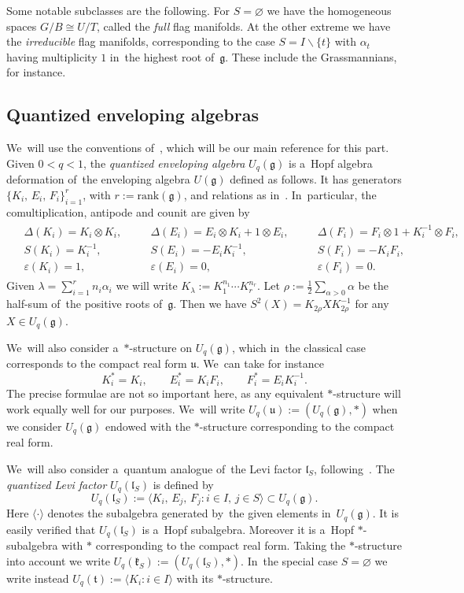 \documentclass[pdftex]{sigma}
\numberwithin{equation}{section}
\newcommand{\lieg}{\mathfrak{g}}
\newcommand{\liel}{\mathfrak{l}}
\newcommand{\lieu}{\mathfrak{u}}
\newcommand{\Uqg}{U_q(\mathfrak{g})}
\newcommand{\Uqt}{U_q(\mathfrak{t})}
\newcommand{\Uqu}{U_q(\mathfrak{u})}
\newcommand{\UqkS}{U_q(\mathfrak{k}_S)}
\newcommand{\UqlS}{U_q(\mathfrak{l}_S)}
\begin{document}
Some notable subclasses are the following.
For $S = \varnothing$ we have the homogeneous spaces $G / B \cong U / T$, called the \emph{full} flag manifolds.
At the other extreme we have the \emph{irreducible} flag manifolds, corresponding to the case $S = I \backslash \{t\}$ with $\alpha_t$ having multiplicity $1$ in~the highest root of~$\lieg$. These include the Grassmannians, for instance.

\subsection{Quantized enveloping algebras}

We~will use the conventions of~\cite{klsc}, which will be our main reference for this part.
Given $0 < q < 1$, the \emph{quantized enveloping algebra} $\Uqg$ is a~Hopf algebra deformation of~the enveloping algebra $U(\lieg)$ defined as follows.
It has generators $\{ K_i,\,E_i,\, F_i \}_{i = 1}^r$, with $r := \mathrm{rank}(\lieg)$, and relations as in~\cite[Section~6.1.2]{klsc}.
In~particular, the comultiplication, antipode and counit are given by
\begin{gather*}
\begin{aligned}
&\Delta(K_i) = K_i \otimes K_i,\quad
&&\Delta(E_i) = E_i \otimes K_i + 1 \otimes E_i,\quad
&&\Delta(F_i) = F_i \otimes 1 + K_i^{-1} \otimes F_i,
\\
&S(K_i) = K_i^{-1},
&&S(E_i) = - E_i K_i^{-1},
&&S(F_i) = - K_i F_i,
\\
&\varepsilon(K_i) = 1,
&&\varepsilon(E_i) = 0,
&&\varepsilon(F_i) = 0.
\end{aligned}
\end{gather*}
Given $\lambda = \sum_{i = 1}^r n_i \alpha_i$ we will write $K_\lambda := K_1^{n_1} \cdots K_r^{n_r}$.
Let $\rho := \frac{1}{2} \sum_{\alpha > 0} \alpha$ be the half-sum of~the positive roots of~$\lieg$.
Then we have $S^2(X) = K_{2 \rho} X K_{2 \rho}^{-1}$ for any $X \in \Uqg$.

We~will also consider a~$*$-structure on $\Uqg$, which in~the classical case corresponds to the compact real form $\lieu$.
We~can take for instance
\[
K_i^* = K_i, \qquad
E_i^* = K_i F_i, \qquad
F_i^* = E_i K_i^{-1}.
\]
The precise formulae are not so important here, as any equivalent $*$-structure will work equally well for our purposes.
We~will write $\Uqu := (\Uqg, *)$ when we consider $\Uqg$ endowed with the $*$-structure corresponding to the compact real form.

We~will also consider a~quantum analogue of~the Levi factor $\liel_S$, following~\cite{quantum-flag}.
The \emph{quantized Levi factor} $\UqlS$ is defined by
\[
\UqlS := \langle K_i, \, E_j, \, F_j \colon i \in I, \, j \in S \rangle \subset \Uqg.
\]
Here $\langle \cdot \rangle$ denotes the subalgebra generated by~the given elements in~$\Uqg$.
It is easily verified that $\UqlS$ is a~Hopf subalgebra.
Moreover it is a~Hopf $*$-subalgebra with $*$ corresponding to the compact real form.
Taking the $*$-structure into account we write $\UqkS := (\UqlS, *)$.
In~the special case $S = \varnothing$ we write instead $\Uqt := \langle K_i\colon i \in I \rangle$ with its $*$-structure.
\end{document}
